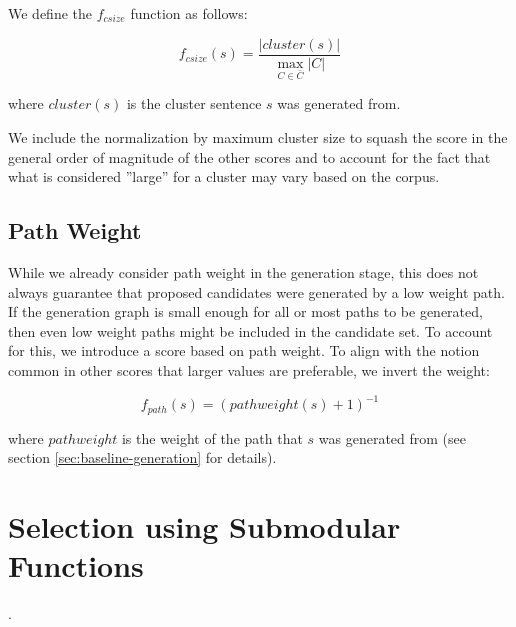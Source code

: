 \documentclass[a4paper,BCOR=10mm]{report}
\numberwithin{lemma}{chapter}
\numberwithin{definition}{chapter}
\begin{document}
We define the $f_{\mathit{csize}}$ function as follows:

\begin{equation}
f_{\mathit{csize}}(s) = \frac{|\mathit{cluster}(s)|}{\max_{C \in \bar{C}}{|C|}}
\end{equation}

where $\mathit{cluster}(s)$ is the cluster sentence $s$ was generated from.

We include the normalization by maximum cluster size to squash the score in the general order of magnitude of the other scores and to account for the fact that what is considered ''large'' for a cluster may vary based on the corpus.


\subsection{Path Weight}

While we already consider path weight in the generation stage, this does not always guarantee that proposed candidates were generated by a low weight path. If the generation graph is small enough for all or most paths to be generated, then even low weight paths might be included in the candidate set.
To account for this, we introduce a score based on path weight. To align with the notion common in other scores that larger values are preferable, we invert the weight:

\begin{equation}
f_{path}(s) = (\mathit{pathweight}(s) + 1)^{-1}
\end{equation}

where $\mathit{pathweight}$ is the weight of the path that $s$ was generated from (see section \ref{sec:baseline-generation} for details).


\section{Selection using Submodular Functions} \label{sec:system-selection}.

\end{document}
